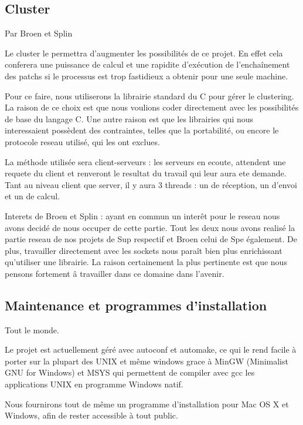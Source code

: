 \documentclass[14pt,a4paper]{article}
\begin{document}
\subsection{Cluster}
Par Broen et Splin\\
\par
Le cluster le permettra d'augmenter les possibilit\'es de ce projet.
 En effet cela conferera une puissance de calcul et une rapidite
 d'ex\'ecution de l'encha\^inement des patchs si le processus est
 trop fastidieux a obtenir pour une seule machine.\\
\par
Pour ce faire, nous utiliserons la librairie standard du C pour
 g\'erer le clustering. La raison de ce choix est que nous voulions
 coder directement avec les possibilit\'es de base du langage C.
 Une autre raison est que les librairies qui nous interessaient
 poss\`edent des contraintes, telles que la portabilit\'e, ou encore
 le protocole reseau utilis\'e, qui les ont exclues.\\
\par
La m\'ethode utilis\'ee sera client-serveurs : les serveurs en ecoute,
 attendent une requete du client et renveront le resultat du travail qui
 leur aura ete demande. Tant au niveau client que server, il y aura 3
 threads : un de r\'eception, un d'envoi et un de calcul.\\
\par
Interets de Broen et Splin : ayant en commun un inter\^et pour le reseau
 nous avons decid\'e de nous occuper de cette partie. Tout les deux nous
 avons realis\'e la partie reseau de nos projets de Sup respectif et
 Broen celui de Spe \'egalement. De plus, travailler directement avec
 les sockets nous para\^it bien plus enrichissant qu'utiliser une librairie.
 La raison certainement la plus pertinente est que nous pensons fortement
 \^a travailler dans ce domaine dans l'avenir.

\subsection{Maintenance et programmes d'installation}
Tout le monde.
\\
\par
Le projet est actuellement g\'er\'e avec autoconf et automake, ce qui le rend
facile \`a porter sur la plupart des UNIX et m\^eme windows grace \`a 
MinGW (Minimalist GNU for Windows) et MSYS qui permettent de compiler avec gcc
les applications UNIX en programme Windows natif.\\
\par
Nous fournirons tout de m\^eme un programme d'installation pour Mac OS X
et Windows, afin de rester accessible \`a tout public.
\end{document}
